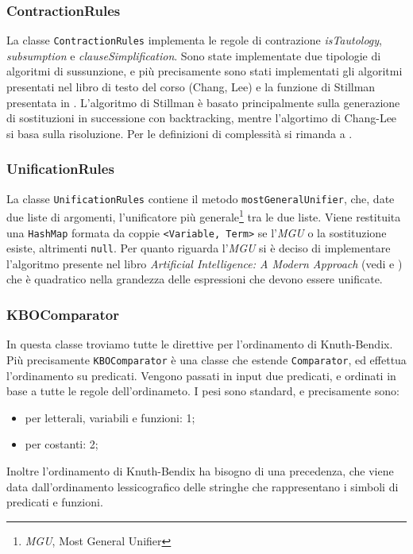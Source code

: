 \documentclass[a4paper,11pt]{article}
\begin{document}
\subsubsection{ContractionRules}
La classe \texttt{ContractionRules} implementa le regole di contrazione \emph{isTautology}, \emph{subsumption} e \emph{clauseSimplification}. Sono state implementate due tipologie di algoritmi di sussunzione, e più precisamente sono stati implementati gli algoritmi presentati nel libro di testo del corso (Chang, Lee)\cite{ChangLee} e la funzione di Stillman presentata in \cite{Gottlob}. L'algoritmo di Stillman è basato principalmente sulla generazione di sostituzioni in successione con backtracking, mentre l'algortimo di Chang-Lee si basa sulla risoluzione. Per le definizioni di complessità si rimanda a \cite{Gottlob}.
\subsubsection{UnificationRules}
La classe \texttt{UnificationRules} contiene il metodo \texttt{mostGeneralUnifier}, che, date due liste di argomenti, l'unificatore più generale\footnote{\emph{MGU}, Most General Unifier} tra le due liste. Viene restituita una \texttt{HashMap} formata da coppie \texttt{<Variable, Term>} se l'\emph{MGU} o la sostituzione esiste, altrimenti \texttt{null}. Per quanto riguarda l'\emph{MGU} si è deciso di implementare l'algoritmo presente nel libro \emph{Artificial Intelligence: A Modern Approach} (vedi \cite{AIMAbook} e \cite{AIMAalgo}) che è quadratico nella grandezza delle espressioni che devono essere unificate.
\subsubsection{KBOComparator}
In questa classe troviamo tutte le direttive per l'ordinamento di Knuth-Bendix. Più precisamente \texttt{KBOComparator} è una classe che estende \texttt{Comparator}, ed effettua l'ordinamento su predicati. Vengono passati in input due predicati, e ordinati in base a tutte le regole dell'ordinameto. I pesi sono standard, e precisamente sono:
\begin{itemize}
\item per letterali, variabili e funzioni: 1;
\item per costanti: 2;
\end{itemize}
Inoltre l'ordinamento di Knuth-Bendix ha bisogno di una precedenza, che viene data dall'ordinamento lessicografico delle stringhe che rappresentano i simboli di predicati e funzioni.
\end{document}
